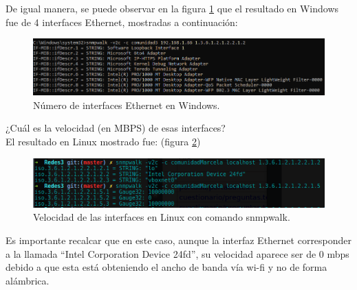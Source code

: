 De igual manera, se puede observar en la figura \ref{image:interfacesw} que el resultado en Windows fue de 4 interfaces Ethernet, mostradas a continuación:

\FloatBarrier
\begin{figure}[htbp!]
		\centering
			\includegraphics[width=.9 \textwidth]{images/windows2}
		\caption{Número de interfaces Ethernet en Windows.}
		\label{image:interfacesw}
\end{figure}
\FloatBarrier

\item ¿Cuál es la velocidad (en MBPS) de esas interfaces?
\\ El resultado en Linux mostrado fue:
(figura \ref{image:velocidadInterfaces})
\FloatBarrier
\begin{figure}[htbp!]
		\centering
			\includegraphics[width=.9 \textwidth]{images/Pregunta3L}
		\caption{Velocidad de las interfaces en Linux con comando snmpwalk.}
		\label{image:velocidadInterfaces}
\end{figure}
\FloatBarrier
Es importante recalcar que en este caso, aunque la interfaz Ethernet corresponder a la llamada ``Intel Corporation Device 24fd'', su velocidad aparece ser de 0 mbps debido a que esta está obteniendo el ancho de banda vía wi-fi y no de forma alámbrica.


